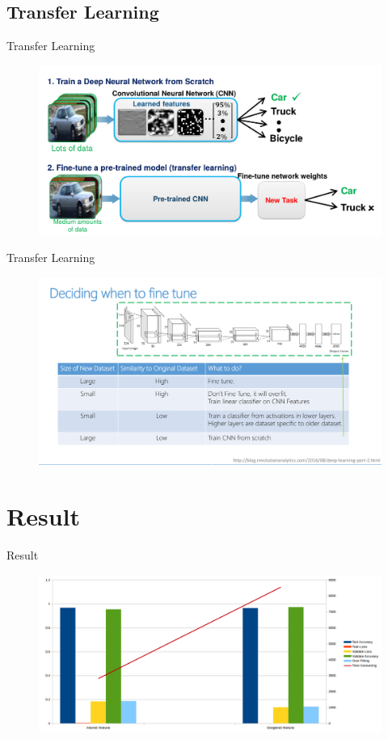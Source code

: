 \documentclass[12pt]{beamer}
\begin{document}
\subsection{Transfer Learning}
\begin{frame}{Transfer Learning}
\begin{figure}
\includegraphics[width=\textwidth]{images/Training_Deep_Learning_Models_with_Transfer_Learning_thumb}
\end{figure}
\end{frame}

\begin{frame}{Transfer Learning}
\begin{figure}
\includegraphics[width=\textwidth]{images/when_finetune.png}
\end{figure}
\end{frame}

\section{Result}
\begin{frame}{Result}
\begin{figure}
\includegraphics[width=\textwidth]{images/final_result.png}
\end{figure}
\end{frame}
\end{document}
